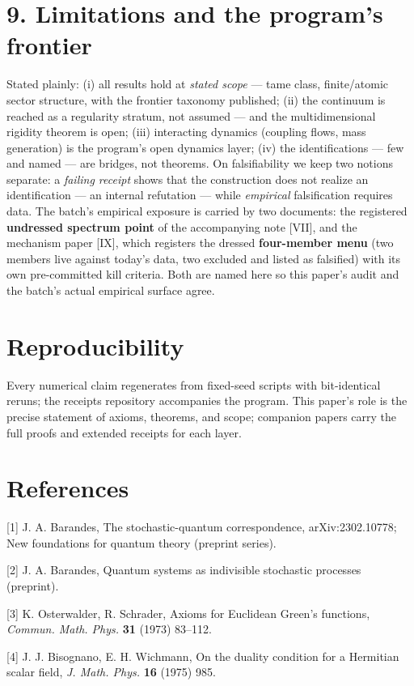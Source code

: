 \documentclass[11pt]{article}
\begin{document}
\section*{9. Limitations and the program's frontier}
Stated plainly: (i) all results hold at \emph{stated scope} — tame class, finite/atomic sector structure, with the frontier taxonomy published; (ii) the continuum is reached as a regularity stratum, not assumed — and the multidimensional rigidity theorem is open; (iii) interacting dynamics (coupling flows, mass generation) is the program's open dynamics layer; (iv) the identifications — few and named — are bridges, not theorems.  On falsifiability we keep two notions separate: a \emph{failing receipt} shows that the construction does not realize an identification — an internal refutation — while \emph{empirical} falsification requires data.  The batch's empirical exposure is carried by two documents: the registered \textbf{undressed spectrum point} of the accompanying note [VII], and the mechanism paper [IX], which registers the dressed \textbf{four-member menu} (two members live against today's data, two excluded and listed as falsified) with its own pre-committed kill criteria.  Both are named here so this paper's audit and the batch's actual empirical surface agree.

\section*{Reproducibility}
Every numerical claim regenerates from fixed-seed scripts with bit-identical reruns; the receipts repository accompanies the program.  This paper's role is the precise statement of axioms, theorems, and scope; companion papers carry the full proofs and extended receipts for each layer.

\section*{References}
[1] J. A. Barandes, The stochastic-quantum correspondence, arXiv:2302.10778; New foundations for quantum theory (preprint series).

[2] J. A. Barandes, Quantum systems as indivisible stochastic processes (preprint).

[3] K. Osterwalder, R. Schrader, Axioms for Euclidean Green's functions, \emph{Commun. Math. Phys.} \textbf{31} (1973) 83–112.

[4] J. J. Bisognano, E. H. Wichmann, On the duality condition for a Hermitian scalar field, \emph{J. Math. Phys.} \textbf{16} (1975) 985.
\end{document}

